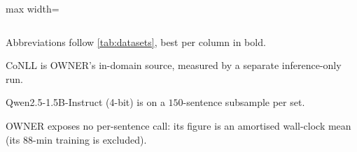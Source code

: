\documentclass[pdflatex,sn-basic,Numbered]{sn-jnl}
\begin{document}
\begin{table}[p]
\begin{adjustbox}{max width=\textwidth}
\begin{threeparttable}
\begin{tabular}{l*{13}{c}c}
\bottomrule
\end{tabular}
\begin{tablenotes}[flushleft]
\footnotesize
\item Abbreviations follow \autoref{tab:datasets}, best per column in bold.
\item[a] CoNLL is OWNER's in-domain source, measured by a separate inference-only run.
\item[b] Qwen2.5-1.5B-Instruct (4-bit) is on a $150$-sentence subsample per set.
\item[c] OWNER exposes no per-sentence call: its figure is an amortised wall-clock mean (its $88$-min training is excluded).
\end{tablenotes}
\end{threeparttable}
\end{adjustbox}
\end{table}
\end{document}
